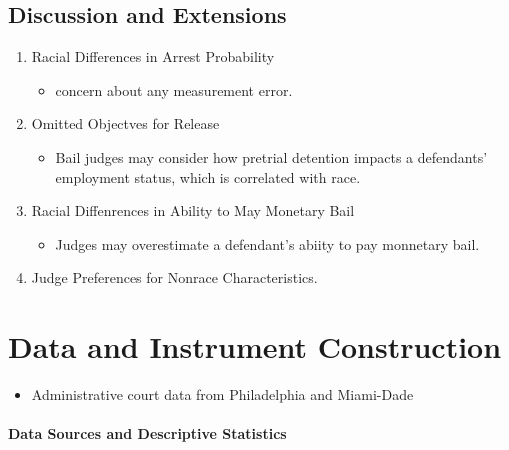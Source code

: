 \documentclass[../root]{subfiles}
\begin{document}
    \subsection{Discussion and Extensions}

    \begin{enumerate}
      \item Racial Differences in Arrest Probability
      \begin{itemize}
        \item concern about any measurement error.
      \end{itemize}
      \item Omitted Objectves for Release
      \begin{itemize}
        \item Bail judges may consider how pretrial detention impacts a defendants' employment status, which is correlated with race.
      \end{itemize}
      \item Racial Diffenrences in Ability to May Monetary Bail
      \begin{itemize}
        \item Judges may overestimate a defendant's abiity to pay monnetary bail.
      \end{itemize}
      \item Judge Preferences for Nonrace Characteristics.
    \end{enumerate}

    \section{Data and Instrument Construction}

    \begin{itemize}
      \item Administrative court data from Philadelphia and Miami-Dade
    \end{itemize}

    \paragraph{Data Sources and Descriptive Statistics}
\end{document}
